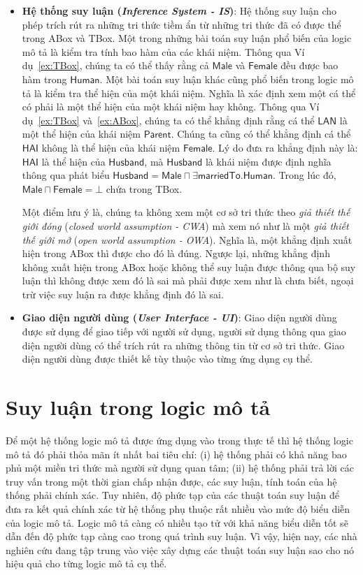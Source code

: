 \documentclass[12pt,a4paper]{report}
\newcommand{\mand}{\sqcap}
\newcommand{\E}{\exists}
\begin{document}
\begin{itemize}
  \item \textbf{Hệ thống suy luận (\textit{Inference System - IS})}: Hệ thống suy luận cho phép trích rút ra những tri thức tiềm ẩn từ những tri thức đã có được thể trong ABox và TBox. Một trong những bài toán suy luận phổ biến của logic mô tả là kiểm tra tính bao hàm của các khái niệm. Thông qua Ví dụ~\ref{ex:TBox}, chúng ta có thể thấy rằng cả $\mathsf{Male}$ và $\mathsf{Female}$ đều được bao hàm trong $\mathsf{Human}$. Một bài toán suy luận khác cũng phổ biến trong logic mô tả là kiểm tra thể hiện của một khái niệm. Nghĩa là xác định xem một cá thể có phải là một thể hiện của một khái niệm hay không. Thông qua Ví dụ~\ref{ex:TBox} và~\ref{ex:ABox}, chúng ta có thể khẳng định rằng cá thể $\mathsf{LAN}$ là một thể hiện của khái niệm $\mathsf{Parent}$. Chúng ta cũng có thể khẳng định cá thể $\mathsf{HAI}$ không là thể hiện của khái niệm $\mathsf{Female}$. Lý do đưa ra khẳng định này là: $\mathsf{HAI}$ là thể hiện của $\mathsf{Husband}$, mà $\mathsf{Husband}$ là khái niệm được định nghĩa thông qua phát biểu $\mathsf{Husband = Male \mand \E marriedTo.Human}$. Trong lúc đó, $\mathsf{Male \mand Female = \bot}$ chứa trong TBox.

Một điểm lưu ý là, chúng ta không xem một cơ sở tri thức theo \textit{giả thiết thế giới đóng} (\textit{closed world assumption - CWA}) mà xem nó như là một \textit{giả thiết thế giới mở} (\textit{open world assumption - OWA}). Nghĩa là, một khẳng định xuất hiện trong ABox thì được cho đó là đúng. Ngược lại, những khẳng định không xuất hiện trong ABox hoặc không thể suy luận được thông qua bộ suy luận thì không được xem đó là sai mà phải được xem như là chưa biết, ngoại trừ việc suy luận ra được khẳng định đó là sai.

  \item \textbf{Giao diện người dùng (\textit{User Interface - UI})}: Giao diện người dùng được sử dụng để giao tiếp với người sử dụng, người sử dụng thông qua giao diện người dùng có thể trích rút ra những thông tin từ cơ sở tri thức. Giao diện người dùng được thiết kế tùy thuộc vào từng ứng dụng cụ thể.
  
\end{itemize}

\section{Suy luận trong logic mô tả}\label{sec:ReasoningInDL}

Để một hệ thống logic mô tả được ứng dụng vào trong thực tế thì hệ thống logic mô tả đó phải thỏa mãn ít nhất bai tiêu chí: (i) hệ thống phải có khả năng bao phủ một miền tri thức mà người sử dụng quan tâm; (ii) hệ thống phải trả lời các truy vấn trong một thời gian chấp nhận được, các suy luận, tính toán của hệ thống phải chính xác. Tuy nhiên, độ phức tạp của các thuật toán suy luận để đưa ra kết quả chính xác từ hệ thống phụ thuộc rất nhiều vào mức độ biểu diễn của logic mô tả. Logic mô tả càng có nhiều tạo tử với khả năng biểu diễn tốt sẽ dẫn đến độ phức tạp càng cao trong quá trình suy luận. Vì vậy, hiện nay, các nhà nghiên cứu đang tập trung vào việc xây dựng các thuật toán suy luận sao cho nó hiệu quả cho từng logic mô tả cụ thể.
\end{document}
